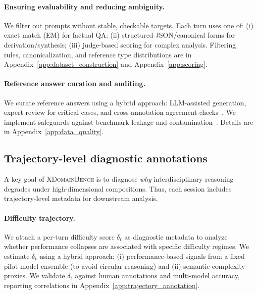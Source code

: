 \paragraph{Ensuring evaluability and reducing ambiguity.}
We filter out prompts without stable, checkable targets.
Each turn uses one of: (i) exact match (EM) for factual QA; (ii) structured JSON/canonical forms for derivation/synthesis; (iii) judge-based scoring for complex analysis.
Filtering rules, canonicalization, and reference type distributions are in Appendix~\ref{app:dataset_construction} and Appendix~\ref{app:scoring}.

\paragraph{Reference answer curation and auditing.}
We curate reference answers using a hybrid approach: LLM-assisted generation, expert review for critical cases, and cross-annotation agreement checks~\citep{li2024arenahard,zhou2023instruction}.
We implement safeguards against benchmark leakage and contamination~\citep{deng-etal-2024-investigating}.
Details are in Appendix~\ref{app:data_quality}.






\subsection{Trajectory-level diagnostic annotations}
\label{sec:diagnostic_signals}

A key goal of \textsc{XDomainBench} is to diagnose \emph{why} interdisciplinary reasoning degrades under high-dimensional compositions.
Thus, each session includes trajectory-level metadata for downstream analysis.

\paragraph{Difficulty trajectory.}
We attach a per-turn difficulty score $\delta_t$ as diagnostic metadata to analyze whether performance collapses are associated with specific difficulty regimes.
We estimate $\delta_t$ using a hybrid approach: (i) performance-based signals from a fixed pilot model ensemble (to avoid circular reasoning) and (ii) semantic complexity proxies.
We validate $\delta_t$ against human annotations and multi-model accuracy, reporting correlations in Appendix~\ref{app:trajectory_annotation}.

